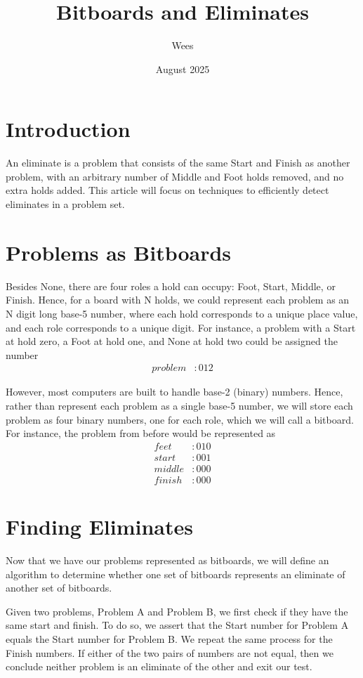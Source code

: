 \documentclass{article}
\title{Bitboards and Eliminates}
\author{Wees}
\date{August 2025}
\begin{document}
\maketitle

\section{Introduction}
An eliminate is a problem that consists of the same Start and Finish as another problem, 
with an arbitrary number of Middle and Foot holds removed, and no extra holds added. 
This article will focus on techniques to efficiently detect eliminates in a problem set.

\section{Problems as Bitboards}
Besides None, there are four roles a hold can occupy: Foot, Start, Middle, or Finish. 
Hence, for a board with N holds, we could represent each problem as an N digit long
base-5 number, where each hold corresponds to a unique place value, 
and each role corresponds to a unique digit. 
For instance, a problem with a Start at hold zero, a Foot at hold one, 
and None at hold two could be assigned the number
\begin{align*}
    problem &: 012
\end{align*}

However, most computers are built to handle base-2 (binary) numbers. 
Hence, rather than represent each problem as a single base-5 number, 
we will store each problem as four binary numbers, one for each role, 
which we will call a bitboard. For instance, 
the problem from before would be represented as
\begin{align*}
    feet &: 010 \\
    start &: 001 \\
    middle &: 000 \\
    finish &: 000
\end{align*} 

\section{Finding Eliminates}
Now that we have our problems represented as bitboards, 
we will define an algorithm to determine whether one set of bitboards
represents an eliminate of another set of bitboards.

Given two problems, Problem A and Problem B, 
we first check if they have the same start and finish.
To do so, we assert that the Start number for Problem A equals the Start number for Problem B. 
We repeat the same process for the Finish numbers. 
If either of the two pairs of numbers are not equal, 
then we conclude neither problem is an eliminate of the other and exit our test.
\end{document}
